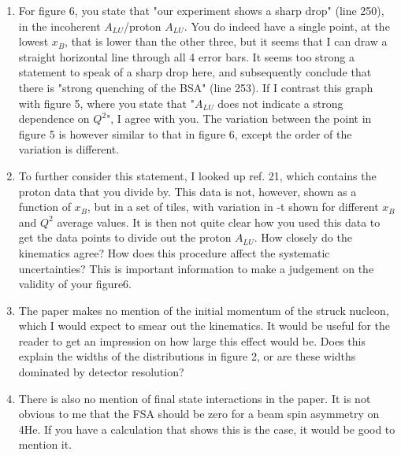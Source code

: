 \documentclass[a4paper,11pt,twoside]{article}
\begin{document}
\begin{enumerate}
  
\item    For figure 6, you state that "our experiment shows a sharp drop" (line 
   250), in the incoherent $A_{LU}$/proton $A_{LU}$. You do indeed have a 
      single point, at the lowest $x_B$, that is lower than the other three, 
      but it seems that I can draw a straight horizontal line through all 4 
      error bars. It seems too strong a statement to speak of a sharp drop 
      here, and subsequently conclude that there is "strong quenching of the 
      BSA" (line 253). If I contrast this graph with figure 5, where you state 
      that "$A_{LU}$ does not indicate a strong dependence on $Q^2$", I agree 
      with you. The variation between the point in figure 5 is however similar 
      to that in figure 6, except the order of the variation is different.\\ 
      \textcolor{blue}{ }


\item    To further consider this statement, I looked up ref. 21, which 
   contains the proton data that you divide by. This data is not, however, 
      shown as a function of $x_B$, but in a set of tiles, with variation in -t 
      shown for different $x_B$ and $Q^2$ average values. It is then not quite 
      clear how you used this data to get the data points to divide out the 
      proton $A_{LU}$. How closely do the kinematics agree? How does this 
      procedure affect the systematic uncertainties? This is important 
      information to make a judgement on the validity of your figure6.\\
   \textcolor{blue}{ }

\item  The paper makes no mention of the initial momentum of the struck 
   nucleon, which I would expect to smear out the kinematics. It would be 
      useful for the reader to get an impression on how large this effect would 
      be. Does this explain the widths of the distributions in figure 2, or are 
      these widths dominated by detector resolution?\\
   \textcolor{blue}{ }

\item    There is also no mention of final state interactions in the paper. It 
   is not obvious to me that the FSA should be zero for a beam spin asymmetry 
      on 4He. If you have a calculation that shows this is the case, it would 
      be good to mention it.\\
   \textcolor{blue}{ }

\end{enumerate}
\end{document}

